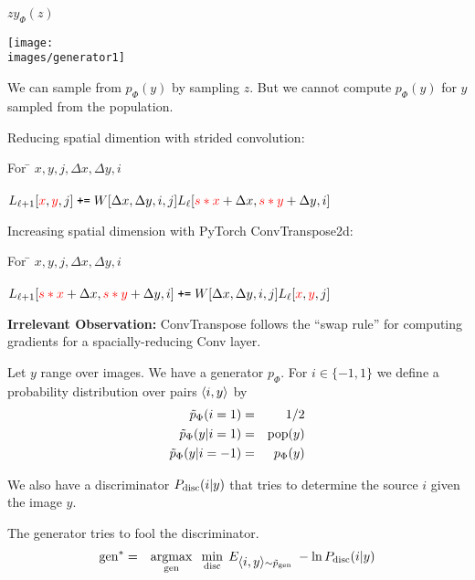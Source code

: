 {\bigskip
\centerline{$z$\hspace{5in}$y_\Phi(z)$}
\centerline{\texttt{[image: \\images/generator1]}}

\bigskip
We can sample from $p_\Phi(y)$ by sampling $z$.  But we cannot compute $p_\Phi(y)$ for $y$ sampled from the population.

 
Reducing spatial dimention with strided convolution:
\begin{tabbing}
For \= $x,y,j,\Delta x,\Delta y, i$ \\
\\
\>$L_{{\ell+1}}[{\color{red}x},{\color{red}y},j]\; \mbox{\tt +=} \;W[\Delta x, \Delta y, i, j] L_{{\ell}}[{\color{red} s*x} + \Delta x, {\color{red} s*y} + \Delta y, i]$
\end{tabbing}

\vfill
Increasing spatial dimension with PyTorch ConvTranspose2d:
\begin{tabbing}
For \= $x,y,j,\Delta x,\Delta y, i$ \\
\\
\>$L_{{\ell+1}}[{\color{red} s*x} + \Delta x, {\color{red} s*y} + \Delta y, i]\; \mbox{\tt +=} \;W[\Delta x, \Delta y, i, j]L_\ell[{\color{red}x},{\color{red}y},j]$
\end{tabbing}

\vfill
{\bf Irrelevant Observation:} ConvTranspose follows the ``swap rule'' for computing gradients for a spacially-reducing Conv layer.


Let $y$ range over images.  We have a generator $p_\Phi$. For $i \in \{-1,1\}$ we define a probability distribution over pairs
${\mbox{$\langle i,y\rangle$}}$ by
\begin{eqnarray*}
\tilde{p}_\Phi(i = 1) & = & 1/2 \\
\tilde{p}_\Phi(y|i=1) & =&  \mathrm{pop}(y) \\
\tilde{p}_\Phi(y|i=-1) & = & p_\Phi(y)
\end{eqnarray*}

\vfill
We also have a discriminator $P_{\mathrm{disc}}(i|y)$ that tries to determine the source $i$ given the image $y$.

\vfill
The generator tries to fool the discriminator.
\begin{eqnarray*}
        \mathrm{gen}^* & = & \operatorname*{argmax}_{\mathrm{gen}}\;\;\min_{\mathrm{disc}}\;E_{{\mbox{$\langle i,y\rangle$}} \sim \tilde{p}_{\mathrm{gen}}}\;-\ln P_{\mathrm{disc}}(i|y)
\end{eqnarray*}

}
